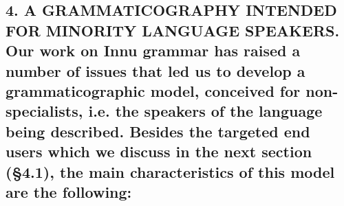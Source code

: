 \documentclass[letterpaper]{article}
\begin{document}
\subsection[4. A GRAMMATICOGRAPHY INTENDED FOR MINORITY LANGUAGE SPEAKERS. Our work on Innu grammar has raised a number of issues that led us to develop a grammaticographic model, conceived for non{}-specialists, i.e. the speakers of the language being described. Besides the targeted end users which we discuss in the next section ({\S}4.1), the main characteristics of this model are the following:]{4. A GRAMMATICOGRAPHY INTENDED FOR MINORITY LANGUAGE SPEAKERS. \textmd{Our work on Innu grammar }\textmd{has }\textmd{raised }\textmd{a number of }\textmd{issues that led us to develop a }\textmd{g}\textmd{rammatico}\textmd{graphic model, }\textmd{conceived }\textmd{for non}\textmd{{}-}\textmd{specialists}\textmd{, }\textmd{i.e. }\textmd{the speakers of the language }\textmd{being }\textmd{described}\textmd{. }\textmd{Besides the targeted }\textmd{end users }\textmd{which}\textmd{ we }\textmd{discuss}\textmd{ in the }\textmd{next}\textmd{ section}\textmd{ ({\S}}\textmd{4}\textmd{.1)}\textmd{, the main characteristics of }\textmd{this}\textmd{ model }\textmd{are the following:}}
\end{document}
